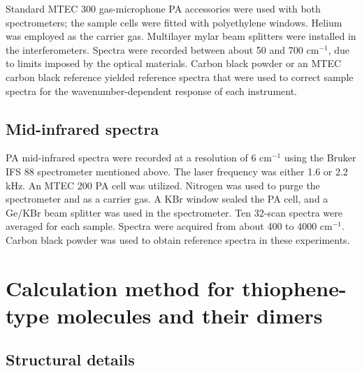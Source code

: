 	Standard MTEC 300 gas-microphone PA accessories were used with both spectrometers; the sample cells were fitted with polyethylene windows. Helium was employed as the carrier gas. Multilayer mylar beam splitters were installed in the interferometers. Spectra were recorded between about 50 and 700 cm$^{-1}$, due to limits imposed by the optical materials. Carbon black powder or an MTEC carbon black reference yielded reference spectra that were used to correct sample spectra for the wavenumber-dependent response of each instrument.\\
	
	\subsection{Mid-infrared spectra}
	
	\bigskip
	
	PA mid-infrared spectra were recorded at a resolution of 6 cm$^{-1}$ using the Bruker IFS 88 spectrometer mentioned above. The laser frequency was either 1.6 or 2.2 kHz. An MTEC 200 PA cell was utilized. Nitrogen was used to purge the spectrometer and as a carrier gas. A KBr window sealed the PA cell, and a Ge/KBr beam splitter was used in the spectrometer. Ten 32-scan spectra were averaged for each sample. Spectra were acquired from about 400 to 4000 cm$^{-1}$. Carbon black powder was used to obtain reference spectra in these experiments.
	
	
	\section{Calculation method for thiophene-type molecules and their dimers}
	
	\subsection{Structural details }
	
